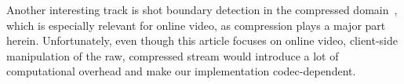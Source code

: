 \documentclass[10pt,twocolumn,letterpaper]{article}
\begin{document}
Another interesting track is shot boundary detection in the compressed domain~\cite{Yeo1995},
which is especially relevant for online video, as compression plays a major part herein.
Unfortunately, even though this article focuses on online video, client-side manipulation of the raw, compressed stream would introduce a lot of computational overhead and make our implementation codec-dependent.

{\small


}
\end{document}
